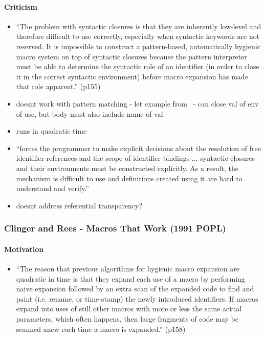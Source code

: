 \documentclass[12pt]{article}	%
\begin{document}
\paragraph{Criticism}
\begin{itemize}
	\item ``The problem with syntactic closures is that they are inherently low-level and therefore difficult to use correctly, especially when syntactic keywords are not reserved. It is impossible to construct a pattern-based, automatically hygienic macro system on top of syntactic closures because the pattern interpreter must be able to determine the syntactic role of an identifier (in order to close it in the correct syntactic environment) before macro expansion has made that role apparent.'' (p155)
	\item doesnt work with pattern matching - let example from~\cite[p157]{Clinger1991Macros} - can close val of env of use, but body must also include name of val
	\item runs in quadratic time
	\item ``forces the programmer to make explicit decisions about the resolution of free identifier references and the scope of identifier bindings $\ldots$ syntactic closures and their environments must be constructed explicitly. As a result, the mechanism is difficult to use and definitions created using it are hard to understand and verify.''~\cite[p299]{Dybvig1992Syntactic}
	\item doesnt address referential transparency?~\cite[p299]{Dybvig1992Syntactic}
\end{itemize}







\subsubsection*{Clinger and Rees - Macros That Work (1991 POPL)}
\paragraph{Motivation}
\begin{itemize}
	\item ``The reason that previous algorithms for hygienic macro expansion are quadratic in time is that they expand each use of a macro by performing naive expansion followed by an extra scan of the expanded code to find and paint (i.e. rename, or time-stamp) the newly introduced identifiers. If macros expand into uses of still other macros with more or less the same actual parameters, which often happens, then large fragments of code may be scanned anew each time a macro is expanded.'' (p158)
\end{itemize}
\end{document}

